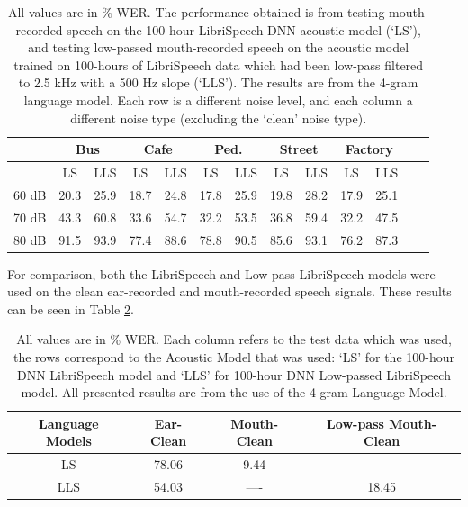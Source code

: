 \begin{table}[h]
\begin{center}
\begin{tabular}{| c || c | c | c | c | c | c | c | c | c | c | c | c |} \hline
      & \multicolumn{2}{|c|}{Bus} & \multicolumn{2}{|c|}{Cafe} & \multicolumn{2}{|c|}{Ped.} & \multicolumn{2}{|c|}{Street} & \multicolumn{2}{|c|}{Factory} \\ \hline
      & LS & LLS & LS & LLS & LS & LLS & LS & LLS & LS & LLS \\ \hline\hline
60 dB & 20.3 & 25.9 & 18.7 & 24.8 & 17.8 & 25.9 & 19.8 & 28.2 & 17.9 & 25.1  \\ \hline
70 dB & 43.3 & 60.8 & 33.6 & 54.7 & 32.2 & 53.5 & 36.8 & 59.4 & 32.2 & 47.5  \\ \hline
80 dB & 91.5 & 93.9 & 77.4 & 88.6 & 78.8 & 90.5 & 85.6 & 93.1 & 76.2 & 87.3  \\ \hline
\end{tabular}
\end{center}
\caption{All values are in \% WER. The performance obtained is from testing mouth-recorded speech on the 100-hour LibriSpeech DNN acoustic model (`LS'), and testing low-passed mouth-recorded speech on the acoustic model trained on 100-hours of LibriSpeech data which had been low-pass filtered to 2.5 kHz with a 500 Hz slope (`LLS').  The results are from the 4-gram language model.  Each row is a different noise level, and each column a different noise type (excluding the `clean' noise type).}\label{tab:lp-mrs-fb-mrs}
\end{table}

For comparison, both the LibriSpeech and Low-pass LibriSpeech models were used on the clean ear-recorded and mouth-recorded speech signals.  These results can be seen in Table \ref{tab:final-clean-speech}.

\begin{table}[h]
\begin{center}
\begin{tabular}{| c || c | c | c |} \hline
Language Models & Ear-Clean & Mouth-Clean & Low-pass Mouth-Clean \\ \hline\hline
LS & 78.06 & 9.44 & ---- \\ \hline
LLS & 54.03 & ---- & 18.45 \\ \hline
\end{tabular}
\end{center}
\caption{All values are in \% WER.  Each column refers to the test data which was used, the rows correspond to the Acoustic Model that was used: `LS' for the 100-hour DNN LibriSpeech model and `LLS' for 100-hour DNN Low-passed LibriSpeech model. All presented results are from the use of the 4-gram Language Model.}\label{tab:final-clean-speech}
\end{table}

